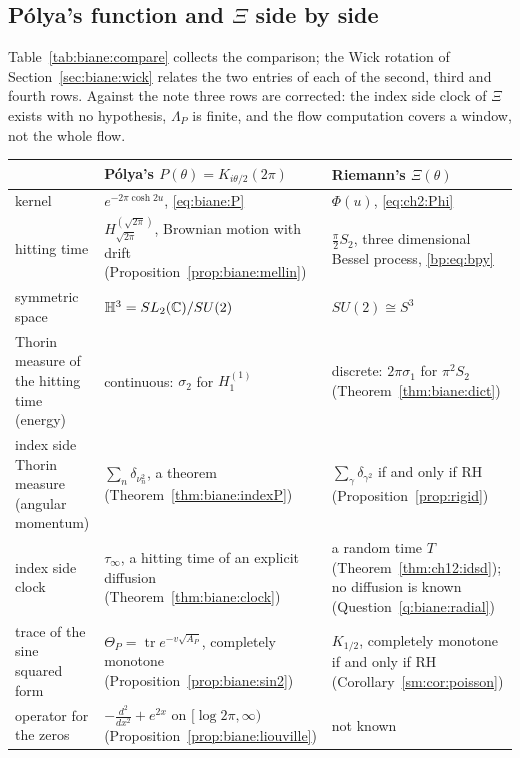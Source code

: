 \subsection{P\'olya's function and \texorpdfstring{$\Xi$}{Xi} side by side}\label{sec:biane:assess}

Table~\ref{tab:biane:compare} collects the comparison; the Wick rotation of Section~\ref{sec:biane:wick} relates the two entries of each of the second, third and fourth rows. Against the note \cite{P26bia} three rows are corrected: the index side clock of $\Xi$ exists with no hypothesis, $\Lambda_P$ is finite, and the flow computation covers a window, not the whole flow.

\begin{table}[htbp]
\centering\small
\begin{tabular}{@{}p{}p{}p{}@{}}
\toprule
& P\'olya's $P(\theta)=K_{i\theta/2}(2\pi)$ & Riemann's $\Xi(\theta)$\\
\midrule
kernel & $e^{-2\pi\cosh2u}$, \eqref{eq:biane:P} & $\Phi(u)$, \eqref{eq:ch2:Phi}\\
hitting time & $H^{(\sqrt{2\pi})}_{\sqrt{2\pi}}$, Brownian motion with drift (Proposition~\ref{prop:biane:mellin}) & $\frac\pi2S_2$, three dimensional Bessel process, \eqref{bp:eq:bpy}\\
symmetric space & $\mathbb H^3=SL_2(\mathbb{C})/SU(2)$ & $SU(2)\cong S^3$\\
Thorin measure of the hitting time (energy) & continuous: $\sigma_2$ for $H^{(1)}_1$ & discrete: $2\pi\sigma_1$ for $\pi^2S_2$ (Theorem~\ref{thm:biane:dict})\\
index side Thorin measure (angular momentum) & $\sum_n\delta_{\nu_n^2}$, a theorem (Theorem~\ref{thm:biane:indexP}) & $\sum_\gamma\delta_{\gamma^2}$ if and only if RH (Proposition~\ref{prop:rigid})\\
index side clock & $\tau_\infty$, a hitting time of an explicit diffusion (Theorem~\ref{thm:biane:clock}) & a random time $T$ (Theorem~\ref{thm:ch12:idsd}); no diffusion is known (Question~\ref{q:biane:radial})\\
trace of the sine squared form & $\Theta_P=\operatorname{tr}e^{-v\sqrt{A_P}}$, completely monotone (Proposition~\ref{prop:biane:sin2}) & $K_{1/2}$, completely monotone if and only if RH (Corollary~\ref{sm:cor:poisson})\\
operator for the zeros & $-\frac{d^2}{dx^2}+e^{2x}$ on $[\log2\pi,\infty)$ (Proposition~\ref{prop:biane:liouville}) & not known\\

\end{tabular}
\end{table}
